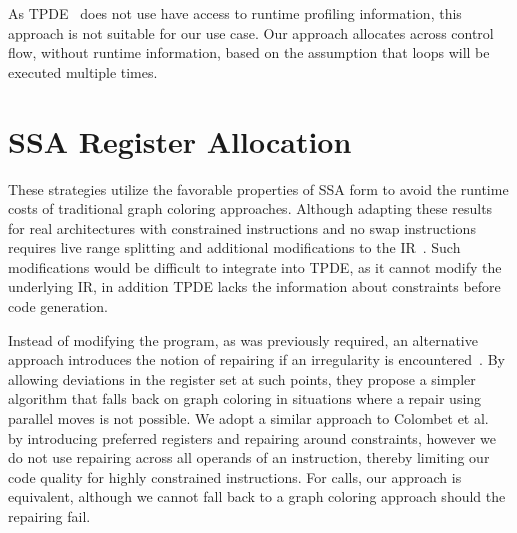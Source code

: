 As TPDE~\cite{tpde} does not use have access to runtime profiling information, this approach is not suitable for our use case. Our approach allocates across control flow,  without runtime information, based on the assumption that loops will be executed multiple times.

\section{SSA Register Allocation}

These strategies utilize the favorable properties of SSA form to avoid the runtime costs of traditional graph coloring approaches. Although adapting these results for real architectures with constrained instructions and no swap instructions requires live range splitting and additional modifications to the IR~\cite{hack-thesis}.
Such modifications would be difficult to integrate into TPDE, as it cannot modify the underlying IR, in addition TPDE lacks the information about constraints before code generation.

Instead of modifying the program, as was previously required, an alternative approach introduces the notion of repairing if an irregularity is encountered~\cite{treescan}. 
By allowing deviations in the register set at such points, they propose a simpler algorithm that falls back on graph coloring in situations where a repair using parallel moves is not possible.
We adopt a similar approach to Colombet et al.~\cite{treescan} by introducing preferred registers and repairing around constraints, however we do not use repairing across all operands of an instruction, thereby limiting our code quality for highly constrained instructions. For calls, our approach is equivalent, although we cannot fall back to a graph coloring approach should the repairing fail.